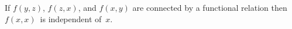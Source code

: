 If $f(y, z)$, $f(z, x)$, and $f(x, y)$ are connected by a functional relation
then $f(x, x)$~is independent of~$x$. 

